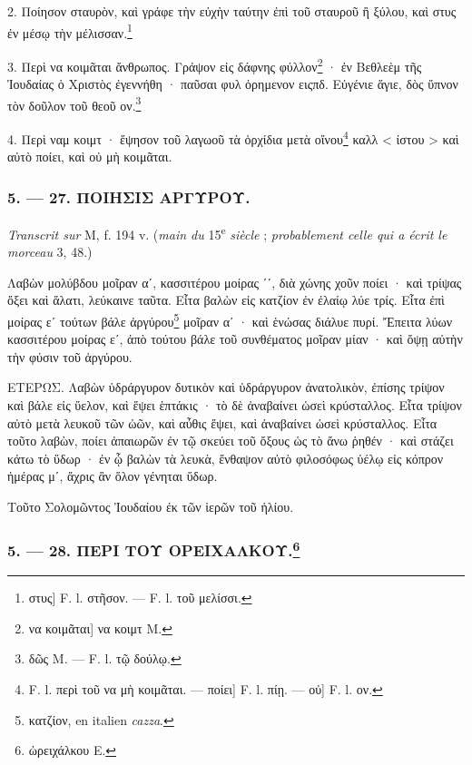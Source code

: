 \documentclass[a4paper, 11pt, oneside, polutonikogreek, french]{article}
\newcommand*\svgA{}
\begin{document}
2. Ποίησον σταυρὸν, καὶ γράφε τὴν εὐχὴν ταύτην ἐπὶ τοῦ σταυροῦ ἢ ξύλου, καὶ στυς ἐν μέσῳ τὴν μέλισσαν.\footnote{στυς] F. l. στῆσον. --- F. l. τοῦ μελίσσι.}

3. Περὶ να κοιμᾶται ἄνθρωπος. Γράψον εἰς δάφνης φύλλον\footnote{να κοιμᾶται] να κοιμτ M.} · ἐν Βεθλεὲμ τῆς Ἰουδαίας ὁ Χριστὸς ἐγεννήθη · παῦσαι φυλ ὀρημενον ειςπδ. Εὐγένιε ἅγιε, δὸς ὕπνον τὸν δοῦλον τοῦ θεοῦ ον.\footnote{δῶς M. --- F. l. τῷ δούλῳ.}

4. Περὶ ναμ κοιμτ · ἕψησον τοῦ λαγωοῦ τὰ ὀρχίδια μετὰ οἴνου\footnote{F. l. περὶ τοῦ να μὴ κοιμᾶται. --- ποίει] F. l. πίῃ. --- οὐ] F. l. ον.} καλλ < ίστου > καὶ αὐτὸ ποίει, καὶ οὐ μὴ κοιμᾶται.

\bigskip
\centerline{\EightStarTaper}
\centerline{\EightStarTaper\EightStarTaper}
\bigskip

\subsubsection{5. --- 27. ΠΟΙΗΣΙΣ ΑΡΓΥΡΟΥ.}

\emph{Transcrit sur} M, f. 194 v. (\emph{main du} 15\textsuperscript{e} \emph{siècle} ; \emph{probablement celle qui a écrit le morceau} 3, 48.)

\bigskip

Λαβὼν μολύβδου μοῖραν αʹ, κασσιτέρου μοίρας $\svgA$ʹʹ, διὰ χώνης χοῦν ποίει · καὶ τρίψας ὄξει καὶ ἅλατι, λεύκαινε ταῦτα. Εἶτα βαλὼν εἰς κατζίον ἐν ἐλαίῳ λύε τρίς. Εἶτα ἐπὶ μοίρας εʹ τούτων βάλε ἀργύρου\footnote{κατζίον, en italien \emph{cazza}.} μοῖραν αʹ · καὶ ἑνώσας διάλυε πυρί. Ἔπειτα λύων κασσιτέρου μοίρας εʹ, ἀπὸ τούτου βάλε τοῦ συνθέματος μοῖραν μίαν · καὶ ὄψῃ αὐτὴν τὴν φύσιν τοῦ ἀργύρου.

ΕΤΕΡΩΣ. Λαβὼν ὑδράργυρον δυτικὸν καὶ ὑδράργυρον ἀνατολικὸν, ἐπίσης τρίψον καὶ βάλε εἰς ὕελον, καὶ ἕψει ἑπτάκις · τὸ δὲ ἀναβαίνει ὡσεὶ κρύσταλλος. Εἶτα τρίψον αὐτὸ μετὰ λευκοῦ τῶν ὠῶν, καὶ αὖθις ἕψει, καὶ ἀναβαίνει ὡσεὶ κρύσταλλος. Εἶτα τοῦτο λαβὼν, ποίει ἀπαιωρῶν ἐν τῷ σκεύει τοῦ ὄξους ὡς τὸ ἄνω ῥηθέν · καὶ στάζει κάτω τὸ ὕδωρ · ἐν ᾧ βαλὼν τὰ λευκὰ, ἔνθαψον αὐτὸ φιλοσόφως ὑέλῳ εἰς κόπρον ἡμέρας μʹ, ἄχρις ἂν ὅλον γένηται ὕδωρ.

Τοῦτο Σολομῶντος Ἰουδαίου ἐκ τῶν ἱερῶν τοῦ ἡλίου.

\bigskip
\centerline{\EightStarTaper}
\centerline{\EightStarTaper\EightStarTaper}
\bigskip

\subsubsection[5. --- 28. ΠΕΡΙ ΤΟΥ ΟΡΕΙΧΑΛΚΟΥ.]{5. --- 28. ΠΕΡΙ ΤΟΥ ΟΡΕΙΧΑΛΚΟΥ.\footnote{ὠρειχάλκου E.}}
\end{document}
